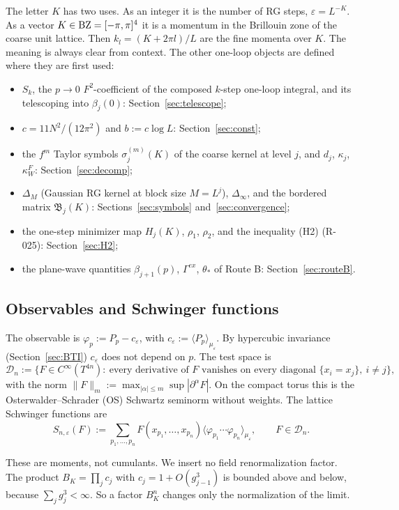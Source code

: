 The letter $K$ has two uses. As an integer it is the number of RG steps, $\varepsilon=L^{-K}$. As a vector $K\in\mathrm{BZ}=[-\pi,\pi]^4$ it is a momentum in the Brillouin zone of the coarse unit lattice. Then $k_l=(K+2\pi l)/L$ are the fine momenta over $K$. The meaning is always clear from context. The other one-loop objects are defined where they are first used:
\begin{itemize}
\item $S_k$, the $p\to0$ $F^2$-coefficient of the composed $k$-step one-loop integral, and its telescoping into $\beta_j(0)$: Section~\ref{sec:telescope};
\item $c=11N^2/(12\pi^2)$ and $b:=c\log L$: Section~\ref{sec:const};
\item the $f^m$ Taylor symbols $\sigma_j^{(m)}(K)$ of the coarse kernel at level $j$, and $d_j$, $\kappa_j$, $\kappa_W^F$: Section~\ref{sec:decomp};
\item $\Delta_M$ (Gaussian RG kernel at block size $M=L^j$), $\Delta_\infty$, and the bordered matrix $\mathfrak B_j(K)$: Sections~\ref{sec:symbols} and~\ref{sec:convergence};
\item the one-step minimizer map $H_j(K)$, $\rho_1$, $\rho_2$, and the inequality (H2) (R-025): Section~\ref{sec:H2};
\item the plane-wave quantities $\beta_{j+1}(p)$, $\Gamma^{ex}$, $\theta_*$ of Route B: Section~\ref{sec:routeB}.
\end{itemize}

\subsection{Observables and Schwinger functions}\label{sec:observables}

\begin{definition}
The observable is $\varphi_p:=P_p-c_\varepsilon$, with $c_\varepsilon:=\langle P_p\rangle_{\mu_\varepsilon}$. By hypercubic invariance (Section~\ref{sec:BTI}) $c_\varepsilon$ does not depend on $p$. The test space is
\[
\mathcal D_n:=\{F\in C^\infty(T^{4n}):\ \text{every derivative of $F$ vanishes on every diagonal } \{x_i=x_j\},\ i\ne j\},
\]
with the norm $\|F\|_m:=\max_{|\alpha|\le m}\sup|\partial^\alpha F|$. On the compact torus this is the Osterwalder--Schrader (OS) Schwartz seminorm without weights. The lattice Schwinger functions are
\[
S_{n,\varepsilon}(F):=\sum_{p_1,\dots,p_n}F(x_{p_1},\dots,x_{p_n})\langle\varphi_{p_1}\cdots\varphi_{p_n}\rangle_{\mu_\varepsilon},\qquad F\in\mathcal D_n .
\]
\end{definition}
These are moments, not cumulants. We insert no field renormalization factor. The product $B_K=\prod_j c_j$ with $c_j=1+O(g_{j-1}^3)$ is bounded above and below, because $\sum_j g_j^3<\infty$. So a factor $B_K^n$ changes only the normalization of the limit.

